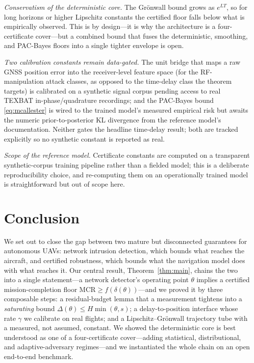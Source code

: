 \documentclass[conference]{IEEEtran}
\newcommand{\MCR}{\mathrm{MCR}}
\begin{document}
\emph{Conservatism of the deterministic core.} The Grönwall bound grows as
$e^{LT}$, so for long horizons or higher Lipschitz constants the certified floor
falls below what is empirically observed. This is by design---it is why the
architecture is a four-certificate cover---but a combined bound that fuses the
deterministic, smoothing, and PAC-Bayes floors into a single tighter envelope is
open.

\emph{Two calibration constants remain data-gated.} The unit bridge that maps a
raw GNSS position error into the receiver-level feature space (for the
RF-manipulation attack classes, as opposed to the time-delay class the theorem
targets) is calibrated on a synthetic signal corpus pending access to real
TEXBAT in-phase/quadrature recordings; and the PAC-Bayes bound
\eqref{eq:mcallester} is wired to the trained model's measured empirical risk
but awaits the numeric prior-to-posterior KL divergence from the reference
model's documentation. Neither gates the headline time-delay result; both are
tracked explicitly so no synthetic constant is reported as real.

\emph{Scope of the reference model.} Certificate constants are computed on a
transparent synthetic-corpus training pipeline rather than a fielded model; this
is a deliberate reproducibility choice, and re-computing them on an
operationally trained model is straightforward but out of scope here.

\section{Conclusion}
\label{sec:conclusion}
We set out to close the gap between two mature but disconnected guarantees for
autonomous UAVs: network intrusion detection, which bounds what reaches the
aircraft, and certified robustness, which bounds what the navigation model does
with what reaches it. Our central result, Theorem~\ref{thm:main}, chains the two
into a single statement---a network detector's operating point $\theta$ implies
a certified mission-completion floor $\MCR\ge f(\delta(\theta))$---and we proved
it by three composable steps: a residual-budget lemma that a measurement tightens
into a \emph{saturating} bound $\Delta(\theta)\le H\min(\theta,s)$; a
delay-to-position interface whose rate $\gamma$ we calibrate on real flights;
and a Lipschitz--Grönwall trajectory tube with a measured, not assumed, constant.
We showed the deterministic core is best understood as one of a four-certificate
cover---adding statistical, distributional, and adaptive-adversary regimes---and
we instantiated the whole chain on an open end-to-end benchmark.
\end{document}
